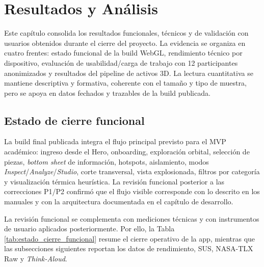 \section{Resultados y Análisis}

Este capítulo consolida los resultados funcionales, técnicos y de validación con usuarios obtenidos durante el cierre del proyecto. La evidencia se organiza en cuatro frentes: estado funcional de la build WebGL, rendimiento técnico por dispositivo, evaluación de usabilidad/carga de trabajo con 12 participantes anonimizados y resultados del pipeline de activos 3D. La lectura cuantitativa se mantiene descriptiva y formativa, coherente con el tamaño y tipo de muestra, pero se apoya en datos fechados y trazables de la build publicada.

\subsection{Estado de cierre funcional}

La build final publicada integra el flujo principal previsto para el MVP académico: ingreso desde el Hero, onboarding, exploración orbital, selección de piezas, \textit{bottom sheet} de información, hotspots, aislamiento, modos \textit{Inspect}/\textit{Analyze}/\textit{Studio}, corte transversal, vista explosionada, filtros por categoría y visualización térmica heurística. La revisión funcional posterior a las correcciones P1/P2 confirmó que el flujo visible corresponde con lo descrito en los manuales y con la arquitectura documentada en el capítulo de desarrollo.

La revisión funcional se complementa con mediciones técnicas y con instrumentos de usuario aplicados posteriormente. Por ello, la Tabla \ref{tab:estado_cierre_funcional} resume el cierre operativo de la app, mientras que las subsecciones siguientes reportan los datos de rendimiento, SUS, NASA-TLX Raw y \textit{Think-Aloud}.

